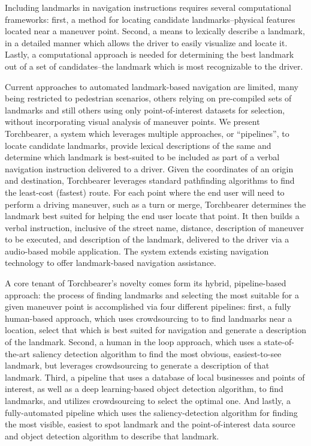 Including landmarks in navigation instructions requires several computational frameworks: first, a method for locating candidate landmarks--physical features located near a maneuver point. Second, a means to lexically describe a landmark, in a detailed manner which allows the driver to easily visualize and locate it. Lastly, a computational approach is needed for determining the best landmark out of a set of candidates--the landmark which is most recognizable to the driver. 

Current approaches to automated landmark-based navigation are limited, many being restricted to pedestrian scenarios, others relying on pre-compiled sets of landmarks and still others using only point-of-interest datasets for selection, without incorporating visual analysis of maneuver points. We present Torchbearer, a system which leverages multiple approaches, or “pipelines”, to locate candidate landmarks, provide lexical descriptions of the same and determine which landmark is best-suited to be included as part of a verbal navigation instruction delivered to a driver. Given the coordinates of an origin and destination, Torchbearer leverages standard pathfinding algorithms to find the least-cost (fastest) route. For each point where the end user will need to perform a driving maneuver, such as a turn or merge, Torchbearer determines the landmark best suited for helping the end user locate that point. It then builds a verbal instruction, inclusive of the street name, distance, description of maneuver to be executed, and description of the landmark, delivered to the driver via a audio-based mobile application. The system extends existing navigation technology to offer landmark-based navigation assistance.
 
A core tenant of Torchbearer's novelty comes form its hybrid, pipeline-based approach: the process of finding landmarks and selecting the most suitable for a given maneuver point is accomplished via four different pipelines: first, a fully human-based approach, which uses crowdsourcing to to find landmarks near a location, select that which is best suited for navigation and generate a description of the landmark. Second, a human in the loop approach, which uses a state-of-the-art saliency detection algorithm to find the most obvious, easiest-to-see landmark, but leverages crowdsourcing to generate a description of that landmark. Third, a pipeline that uses a database of local businesses and points of interest, as well as a deep learning-based object detection algorithm, to find landmarks, and utilizes crowdsourcing to select the optimal one. And lastly, a fully-automated pipeline which uses the saliency-detection algorithm for finding the most visible, easiest to spot landmark and the point-of-interest data source and object detection algorithm to describe that landmark.

